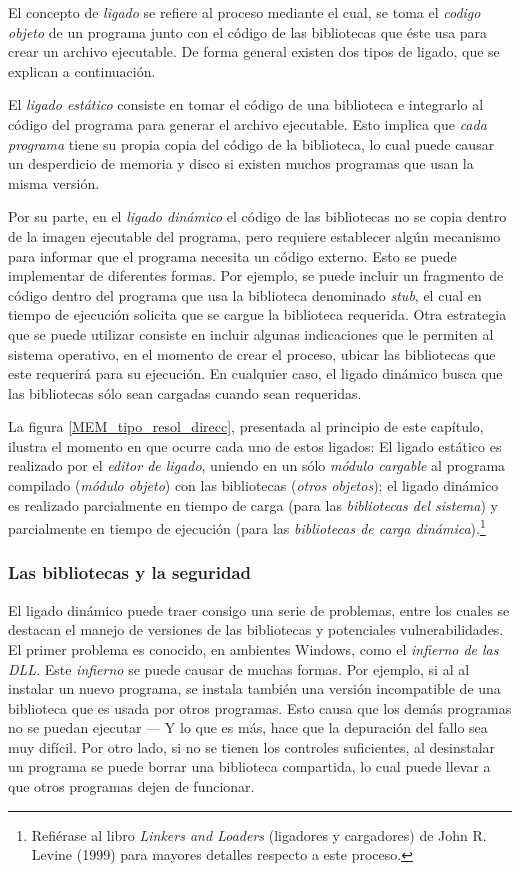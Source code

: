 \documentclass[11pt,fleqn]{book} %
\begin{document}
El concepto de \emph{ligado} se refiere al proceso mediante el cual, se toma el 
\emph{codigo objeto} de un programa junto con el código de las bibliotecas que éste usa
para crear un archivo ejecutable. De forma general existen dos tipos de ligado, que
se explican a continuación.

El \emph{ligado estático} consiste en tomar el código de una biblioteca e integrarlo al
código del programa para generar el archivo ejecutable. Esto implica que
\emph{cada programa} tiene su propia copia del código de la biblioteca, lo cual puede
causar un desperdicio de memoria y disco si existen muchos programas que usan 
la misma versión.

Por su parte, en el \emph{ligado dinámico} el código de las bibliotecas no se copia dentro
de la imagen ejecutable del programa, pero requiere establecer algún mecanismo
para informar que el programa necesita un código externo. Esto se puede implementar 
de diferentes formas. Por ejemplo, se puede incluir un fragmento de código 
dentro del programa que usa la biblioteca denominado \emph{stub}, el cual en tiempo de 
ejecución solicita que se  cargue la biblioteca requerida. Otra estrategia que 
se puede utilizar consiste en  incluir algunas indicaciones que le permiten 
al sistema operativo, en el momento  de crear el proceso, ubicar las 
bibliotecas que este requerirá para su ejecución. En cualquier caso, el ligado 
dinámico busca que las bibliotecas sólo sean cargadas cuando sean requeridas.

La figura \ref{MEM_tipo_resol_direcc}, presentada al principio de este
capítulo, ilustra el momento en que ocurre cada uno de estos ligados:
El ligado estático es realizado por el \emph{editor de ligado}, uniendo en
un sólo \emph{módulo cargable} al programa compilado (\emph{módulo objeto}) con
las bibliotecas (\emph{otros objetos}); el ligado dinámico es realizado
parcialmente en tiempo de carga (para las \emph{bibliotecas del sistema}) y
parcialmente en tiempo de ejecución (para las \emph{bibliotecas de carga dinámica}).\footnote{Refiérase al libro \emph{Linkers and Loaders} (ligadores y
cargadores) de John R. Levine (1999) para mayores detalles respecto a
este proceso. }
\subsubsection{Las bibliotecas y la seguridad}
\label{sec-5-6-2-1}


El ligado dinámico puede traer consigo una serie de problemas, entre los cuales
se destacan el manejo de versiones de las bibliotecas y potenciales vulnerabilidades. 
El primer problema es conocido, en ambientes Windows, como el \emph{infierno de las DLL}. Este
\emph{infierno} se puede causar de muchas formas. Por ejemplo, si al al instalar un nuevo programa,
se instala también una versión incompatible de una biblioteca que es usada por otros programas.
Esto causa que los demás programas no se puedan ejecutar — Y lo que es
más, hace que la depuración del fallo sea muy difícil. Por otro lado, si no se 
tienen los controles suficientes, al desinstalar un programa se puede borrar 
una biblioteca compartida, lo cual puede llevar a que otros programas dejen de funcionar.
\end{document}
